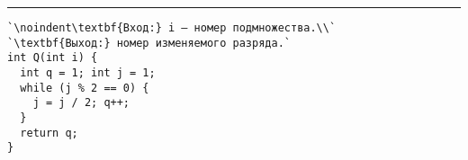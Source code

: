 \documentclass{article}
\begin{document}
\vspace{5pt} \hrule
\begin{lstlisting}[caption={Функция Q определения номера изменяемого разряда}, label=p40_Q, escapechar=`]
`\noindent\textbf{Вход:} i — номер подмножества.\\`
`\textbf{Выход:} номер изменяемого разряда.`
int Q(int i) {
  int q = 1; int j = 1;
  while (j % 2 == 0) {
    j = j / 2; q++;
  }
  return q;
}
\end{lstlisting}
\end{document}
